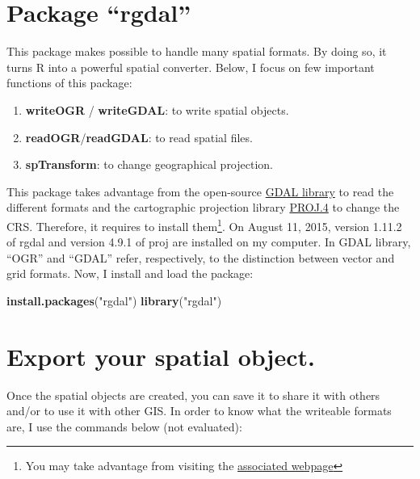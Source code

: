 \documentclass[]{report}
\newenvironment{Shaded}{\begin{snugshade}}{\end{snugshade}}
\newcommand{\KeywordTok}[1]{\textcolor[rgb]{0.13,0.29,0.53}{\textbf{{#1}}}}
\newcommand{\StringTok}[1]{\textcolor[rgb]{0.31,0.60,0.02}{{#1}}}
\newcommand{\NormalTok}[1]{{#1}}
\providecommand{\tightlist}{%
  \setlength{\itemsep}{0pt}\setlength{\parskip}{0pt}}
\let\rmarkdownfootnote\footnote%
\def\footnote{\protect\rmarkdownfootnote}
\begin{document}
\section{\texorpdfstring{Package
``rgdal''}{Package rgdal}}\label{package-rgdal}

This package makes possible to handle many spatial formats. By doing so,
it turns R into a powerful spatial converter. Below, I focus on few
important functions of this package:

\begin{enumerate}
\def\labelenumi{\arabic{enumi}.}
\tightlist
\item
  \textbf{writeOGR} / \textbf{writeGDAL}: to write spatial objects.
\item
  \textbf{readOGR}/\textbf{readGDAL}: to read spatial files.
\item
  \textbf{spTransform}: to change geographical projection.
\end{enumerate}

This package takes advantage from the open-source
\href{http://www.gdal.org/index.html}{GDAL library} to read the
different formats and the cartographic projection library
\href{http://trac.osgeo.org/proj/}{PROJ.4} to change the CRS. Therefore,
it requires to install them\footnote{You may take advantage from
  visiting the
  \href{http://cran.r-project.org/web/packages/rgdal/index.html}{associated
  webpage}}. On August 11, 2015, version 1.11.2 of rgdal and version
4.9.1 of proj are installed on my computer. In GDAL library, ``OGR'' and
``GDAL'' refer, respectively, to the distinction between vector and grid
formats. Now, I install and load the package:

\begin{Shaded}
\begin{Highlighting}[]
\KeywordTok{install.packages}\NormalTok{(}\StringTok{"rgdal"}\NormalTok{)}
\KeywordTok{library}\NormalTok{(}\StringTok{"rgdal"}\NormalTok{)}
\end{Highlighting}
\end{Shaded}

\section{Export your spatial object.}\label{export-your-spatial-object.}

Once the spatial objects are created, you can save it to share it with
others and/or to use it with other GIS. In order to know what the
writeable formats are, I use the commands below (not evaluated):
\end{document}
